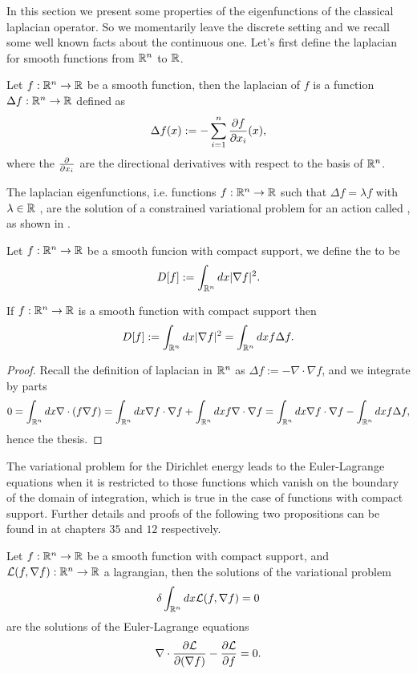 \documentclass[../2.tex]{subfiles}
\begin{document}
In this section we present some properties of the eigenfunctions of the classical laplacian operator.
So we momentarily leave the discrete setting and we recall some well known facts about the continuous one.
Let's first define the laplacian for smooth functions from $\mathbb{R}^n$ to $\mathbb{R}$. 

\begin{defn}
    Let $f : \mathbb{R}^n \to \mathbb{R}$ be a smooth function, then the laplacian of $f$ is a function $\Delta f : \mathbb{R}^n \to \mathbb{R}$ defined as
    \[ \Delta f(x) := - \sum_{i=1}^n \frac{\partial f}{\partial x_i}(x), \]
    where the $\frac{\partial}{\partial x_i}$ are the directional derivatives with respect to the basis of $\mathbb{R}^n$.
\end{defn}

The laplacian eigenfunctions, i.e. functions $f: \mathbb{R}^n \to \mathbb{R}$ such that $\Delta f = \lambda f$ with $\lambda \in \mathbb{R}$ , are the solution of a constrained variational problem for an action called , as shown in \cite{bronstein}.

\begin{defn}
    Let $f:\mathbb{R}^n \to \mathbb{R}$ be a smooth funcion with compact support, we define the  to be
    \[ D[f] := \int_{\mathbb{R}^n} dx |\nabla f|^2 .\]
\end{defn}

\begin{prop}
    If $f:\mathbb{R}^n \to\mathbb{R}$ is a smooth function with compact support then 
    \[ D[f] := \int_{\mathbb{R}^n} dx |\nabla f|^2 = \int_{\mathbb{R}^n} dx f\Delta f .\]
    \label{prop:2:4:3}
\end{prop}
\begin{proof}
    Recall the definition of laplacian in $\mathbb{R}^n$ as $\Delta f := -\nabla \cdot \nabla f$, and we integrate by parts
    \[ 0 = \int_{\mathbb{R}^n} dx \nabla \cdot (f \nabla f) = \int_{\mathbb{R}^n} dx \nabla f \cdot \nabla f + \int_{\mathbb{R}^n} dx f \nabla \cdot \nabla f = \int_{\mathbb{R}^n} dx \nabla f \cdot \nabla f - \int_{\mathbb{R}^n} dx f \Delta f, \]
    hence the thesis. \qedhere
\end{proof}

The variational problem for the Dirichlet energy leads to the Euler-Lagrange equations when it is restricted to those functions which
vanish on the boundary of the domain of integration, which is true in the case of functions with compact support.
Further details and proofs of the following two propositions can be found in \cite{fomin} at chapters $35$ and $12$ respectively.

\begin{prop}
    Let $f:\mathbb{R}^n \to \mathbb{R}$ be a smooth function with compact support, and $\mathcal{L}(f,\nabla f) : \mathbb{R}^n \to \mathbb{R}$ a lagrangian,
    then the solutions of the variational problem 
    \[ \delta\int_{\mathbb{R}^n} dx \mathcal{L}(f,\nabla f) = 0 \]
    are the solutions of the Euler-Lagrange equations
    \[ \nabla \cdot \frac{\partial \mathcal{L}}{\partial(\nabla f)} - \frac{\partial\mathcal{L}}{\partial f} = 0. \]
\end{prop}
\end{document}
